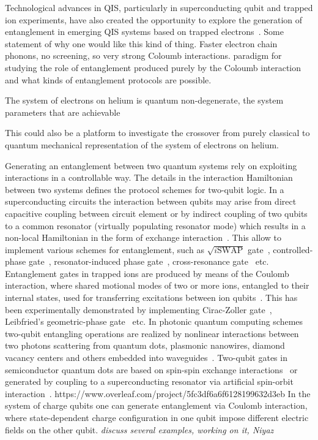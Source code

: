 \documentclass[twocolumn,superscriptaddress,unsortedaddress,
 amsmath,amssymb,
 aps,
]{revtex4-2}
\begin{document}
Technological advances in QIS, particularly in superconducting qubit and trapped ion experiments, have also created the opportunity to explore the generation of entanglement in emerging QIS systems based on trapped electrons~{}. Some statement of why one would like this kind of thing. Faster electron chain phonons, no screening, so very strong Coloumb interactions. paradigm for studying the role of entanglement produced purely by the Coloumb interaction and what kinds of entanglement protocols are possible.

The system of electrons on helium is quantum non-degenerate, the system parameters that are achievable 

This could also be a platform to investigate the crossover from purely classical to quantum mechanical representation of the system of electrons on helium. 

Generating an entanglement between two quantum systems rely on exploiting interactions in a controllable way. The details in the interaction Hamiltonian between two systems defines the protocol schemes for two-qubit logic. In a superconducting circuits the interaction between qubits may arise from direct capacitive coupling between circuit element or by indirect coupling of two qubits to a common resonator (virtually populating resonator mode) which results in a non-local Hamiltonian in the form of exchange interaction~\cite{blais2020circuit}. This allow to implement various schemes for entanglement, such as $\sqrt{i\text{SWAP}}$ gate~\cite{bialczak2010quantum}, controlled-phase gate~\cite{dicarlo2009demonstration}, resonator-induced phase gate~\cite{paik2016experimental}, cross-resonance gate~\cite{chow2011simple} etc. Entanglement gates in trapped ions are produced by means of the Coulomb interaction, where shared motional modes of two or more ions, entangled to their internal states, used for transferring excitations between ion qubits~\cite{cirac1995quantum}. This has been experimentally demonstrated by implementing Cirac-Zoller gate~\cite{turchette1998deterministic}, Leibfried’s geometric-phase gate~\cite{leibfried2003experimental} etc. In photonic quantum computing schemes two-qubit entangling operations are realized by nonlinear interactions between two photons scattering from quantum dots, plasmonic nanowires, diamond vacancy centers and others embedded into waveguides~\cite{bartlett2020universal}. Two-qubit gates in semiconductor quantum dots are based on spin-spin exchange interactions~\cite{brunner2011two,watson2018programmable} or generated by coupling to a superconducting resonator via artificial spin-orbit interaction~\cite{borjans2020resonant}.
https://www.overleaf.com/project/5fc3df6a6f6128199632d3eb
In the system of charge qubits one can generate entanglement via Coulomb interaction, where state-dependent charge configuration in one qubit impose different electric fields on the other qubit. \textit{discuss several examples, working on it, Niyaz}
\end{document}
